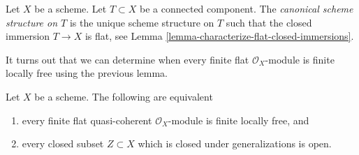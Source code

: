 \begin{definition}
\label{definition-scheme-structure-connected-component}
Let $X$ be a scheme. Let $T \subset X$ be a connected component.
The {\it canonical scheme structure on $T$} is the unique
scheme structure on $T$ such that the closed immersion $T \to X$
is flat, see
Lemma \ref{lemma-characterize-flat-closed-immersions}.
\end{definition}

\noindent
It turns out that we can determine when every finite flat
$\mathcal{O}_X$-module is finite locally free using the previous lemma.

\begin{lemma}
\label{lemma-finite-flat-is-finite-locally-free}
Let $X$ be a scheme. The following are equivalent
\begin{enumerate}
\item every finite flat quasi-coherent $\mathcal{O}_X$-module is
finite locally free, and
\item every closed subset $Z \subset X$ which is closed under generalizations
is open.
\end{enumerate}
\end{lemma}

